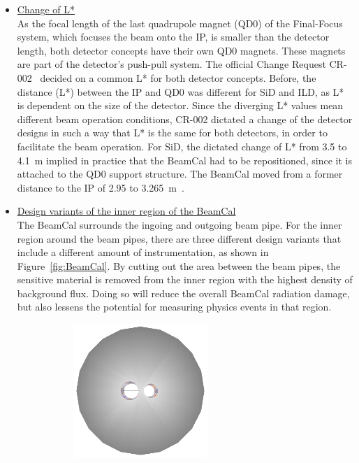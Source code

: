 \begin{itemize}
 \item \underline{Change of L*}\\
 As the focal length of the last quadrupole magnet (QD0) of the Final-Focus system, which focuses the beam onto the IP, is smaller than the detector length, both detector concepts have their own QD0 magnets.
 These magnets are part of the detector's push-pull system.
 The official Change Request CR-002~\cite{CR-002} decided on a common L* for both detector concepts.
 Before, the distance (L*) between the IP and QD0 was different for SiD and ILD, as L* is dependent on the size of the detector.
 Since the diverging L* values mean different beam operation conditions, CR-002 dictated a change of the detector designs in such a way that L* is the same for both detectors, in order to facilitate the beam operation.
 For SiD, the dictated change of L* from 3.5 to \SI{4.1}{\meter} implied in practice that the BeamCal had to be repositioned, since it is attached to the QD0 support structure. 
 The BeamCal moved from a former distance to the IP of 2.95 to \SI{3.265}{\meter}~\cite{SiDBkgNote}.
 \item \underline{Design variants of the inner region of the BeamCal}\\
 The BeamCal surrounds the ingoing and outgoing beam pipe.
 For the inner region around the beam pipes, there are three different design variants that include a different amount of instrumentation, as shown in Figure~\ref{fig:BeamCal}.
 By cutting out the area between the beam pipes, the sensitive material is removed from the inner region with the highest density of background flux.
 Doing so will reduce the overall BeamCal radiation damage, but also lessens the potential for measuring physics events in that region.
 \begin{figure}
 \centering
  \begin{subfigure}[b]{0.3\textwidth}
   \centering
    \includegraphics[width=0.6\textwidth]{Figures/beamcal_plug.png}

\end{subfigure}
\end{figure}
\end{itemize}
